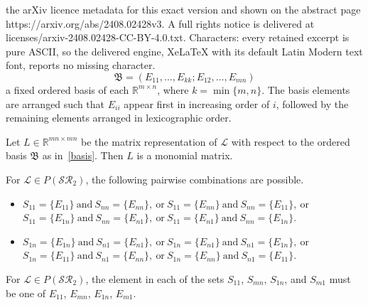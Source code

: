 \documentclass[10pt,a4paper]{amsart}
\begin{document}
the arXiv licence metadata for this exact version and shown on the abstract page https://arxiv.org/abs/2408.02428v3. A full rights notice is delivered at licenses/arxiv-2408.02428-CC-BY-4.0.txt. Characters: every retained excerpt is pure ASCII, so the delivered engine, XeLaTeX with its default Latin Modern text font, reports no missing character.
		\begin{equation}\label{basis}
		\mathfrak{B}=(E_{11},\ldots,E_{kk};E_{12},\ldots,E_{mn})
		\end{equation} a fixed ordered basis of each $\mathbb{R}^{m\times n}$, where $k=\min\{m,n\}$. The basis elements are arranged such that $E_{ii}$ appear first in increasing order of $i$, followed by the remaining elements arranged in lexicographic order.

\begin{prop}\label{SR_square_monomial}
	Let $L\in\mathbb{R}^{mn\times mn}$ be the matrix representation of $\mathcal{L}$ with respect to the ordered basis $\mathfrak{B}$ as in~\eqref{basis}. Then $L$ is a monomial matrix.
\end{prop}

	\begin{prop}\label{SR_square_S11Snn_S1nSn1_combo}
		For $\mathcal{L}\in P(\mathcal{SR}_2)$, the following pairwise combinations are possible.
		\begin{itemize}
			\item[(i)] $S_{11}=\{E_{11}\}\ \text{and} \ S_{nn}=\{E_{nn}\}, \ \text{or} \ S_{11}=\{E_{nn}\} \ \text{and}\ S_{nn}=\{E_{11}\}, \ \text{or}$ \\
			$S_{11}=\{E_{1n}\}\ \text{and}\ S_{nn}=\{E_{n1}\}, \ \text{or}\ S_{11}=\{E_{n1}\} \ \text{and}\ S_{nn}=\{E_{1n}\}$.
			
			\item[(ii)] $S_{1n}=\{E_{1n}\} \ \text{and}\ S_{n1}=\{E_{n1}\}, \ \text{or}\ S_{1n}=\{E_{n1}\} \ \text{and}\ S_{n1}=\{E_{1n}\}, \ \text{or}$ \\
			$S_{1n}=\{E_{11}\} \ \text{and}\ S_{n1}=\{E_{nn}\}, \ \text{or}\ S_{1n}=\{E_{nn}\} \ \text{and}\ S_{n1}=\{E_{11}\}$.
		\end{itemize}
	\end{prop}

 \begin{prop}\label{SR_rectangle_S11SmnS1nSm1_elements}
		For $\mathcal{L}\in P(\mathcal{SR}_2)$, the element in each of the sets $S_{11}$, $S_{mn}$, $S_{1n}$, and $S_{m1}$ must be one of $E_{11}$, $E_{mn}$, $E_{1n}$, $E_{m1}$.
	\end{prop}
\end{document}
